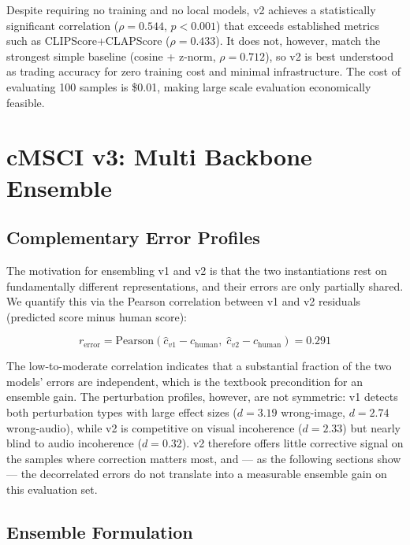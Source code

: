 Despite requiring no training and no local models, v2 achieves a statistically significant correlation ($\rho = 0.544$, $p < 0.001$) that exceeds established metrics such as CLIPScore+CLAPScore ($\rho = 0.433$). It does not, however, match the strongest simple baseline (cosine + z-norm, $\rho = 0.712$), so v2 is best understood as trading accuracy for zero training cost and minimal infrastructure. The cost of evaluating 100 samples is \$0.01, making large scale evaluation economically feasible.

\section{cMSCI v3: Multi Backbone Ensemble}\label{sec:v3}

\subsection{Complementary Error Profiles}\label{sec:v3-errors}

The motivation for ensembling v1 and v2 is that the two instantiations rest on fundamentally different representations, and their errors are only partially shared. We quantify this via the Pearson correlation between v1 and v2 residuals (predicted score minus human score):

\begin{equation}\label{eq:error-corr}
r_{\mathrm{error}} = \mathrm{Pearson}(\hat{c}_{v1} - c_{\mathrm{human}}, \; \hat{c}_{v2} - c_{\mathrm{human}}) = 0.291
\end{equation}

The low-to-moderate correlation indicates that a substantial fraction of the two models' errors are independent, which is the textbook precondition for an ensemble gain. The perturbation profiles, however, are not symmetric: v1 detects both perturbation types with large effect sizes ($d = 3.19$ wrong-image, $d = 2.74$ wrong-audio), while v2 is competitive on visual incoherence ($d = 2.33$) but nearly blind to audio incoherence ($d = 0.32$). v2 therefore offers little corrective signal on the samples where correction matters most, and — as the following sections show — the decorrelated errors do not translate into a measurable ensemble gain on this evaluation set.

\subsection{Ensemble Formulation}\label{sec:v3-formulation}

